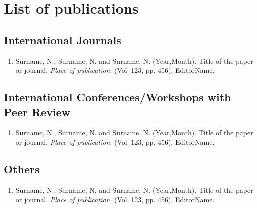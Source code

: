 \chapter*{List of publications}

\section*{International Journals}
\begin{enumerate}
    \item Surname, N., Surname, N. and Surname, N. (Year,Month). Title of the paper or journal. \emph{Place of publication}. (Vol. 123, pp. 456). EditorName.
\end{enumerate}

\section*{International Conferences/Workshops with Peer Review}
\begin{enumerate}
    \item Surname, N., Surname, N. and Surname, N. (Year,Month). Title of the paper or journal. \emph{Place of publication}. (Vol. 123, pp. 456). EditorName.
\end{enumerate}

\section*{Others}
\begin{enumerate}
    \item Surname, N., Surname, N. and Surname, N. (Year,Month). Title of the paper or journal. \emph{Place of publication}. (Vol. 123, pp. 456). EditorName.
\end{enumerate}